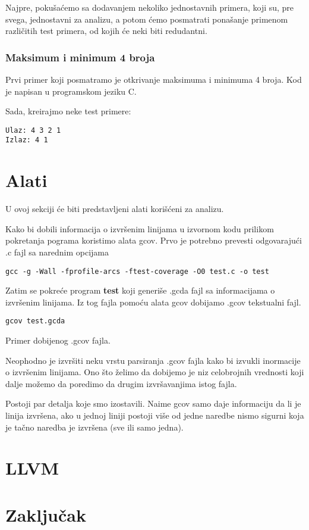 \documentclass[a4paper]{article}
\begin{document}
Najpre, pokušaćemo sa dodavanjem nekoliko jednostavnih primera, koji su, pre svega, jednostavni za analizu, a potom ćemo posmatrati ponašanje primenom različitih test primera, od kojih će neki biti redudantni.

\subsubsection{Maksimum i minimum 4 broja}
Prvi primer koji posmatramo je otkrivanje maksimuma i minimuma 4 broja. Kod je napisan u programskom jeziku C.



Sada, kreirajmo neke test primere:
\begin{verbatim}
Ulaz: 4 3 2 1  
Izlaz: 4 1
\end{verbatim}

\section{Alati}
\label{sec:tools}

U ovoj sekciji će biti predstavljeni alati korišćeni za analizu.

Kako bi dobili informacija o izvršenim linijama u izvornom kodu prilikom pokretanja pograma koristimo alata gcov. Prvo je potrebno prevesti odgovarajući .c fajl sa narednim opcijama

\begin{verbatim}
gcc -g -Wall -fprofile-arcs -ftest-coverage -O0 test.c -o test
\end{verbatim}

Zatim se pokreće program \textbf{test} koji generiše .gcda fajl sa informacijama o izvršenim linijama. Iz tog fajla pomoću alata gcov dobijamo .gcov tekstualni fajl.

\begin{verbatim}
gcov test.gcda
\end{verbatim}

Primer dobijenog .gcov fajla.


Neophodno je izvršiti neku vrstu parsiranja .gcov fajla kako bi izvukli inormacije o izvršenim linijama. Ono što želimo da dobijemo je niz celobrojnih vrednosti koji dalje možemo da poredimo da drugim izvršavanjima istog fajla.

Postoji par detalja koje smo izostavili. Naime gcov samo daje informaciju da li je linija izvršena, ako u jednoj liniji postoji više od jedne naredbe nismo sigurni koja je tačno naredba je izvršena (sve ili samo jedna).


\section{LLVM}
\label{sec:llvm}


\section{Zaključak}
\label{sec:zakljucak}

\appendix
 

\end{document}
